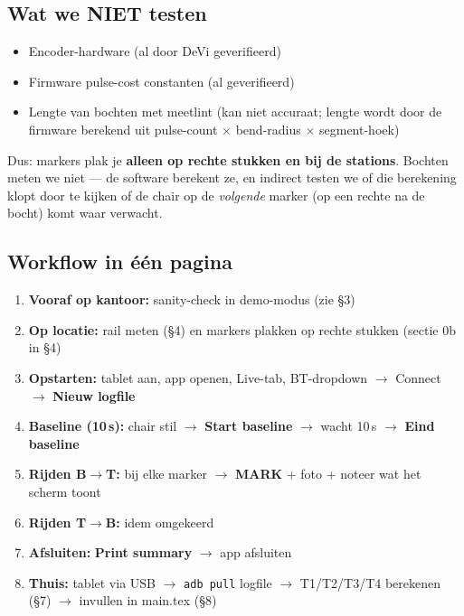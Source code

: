 \documentclass[11pt, a4paper]{article}
\begin{document}
\subsection*{Wat we NIET testen}

\begin{itemize}[leftmargin=2em, label=$\bullet$]
  \item Encoder-hardware (al door DeVi geverifieerd)
  \item Firmware pulse-cost constanten (al geverifieerd)
  \item Lengte van bochten met meetlint (kan niet accuraat; lengte
        wordt door de firmware berekend uit pulse-count $\times$
        bend-radius $\times$ segment-hoek)
\end{itemize}

Dus: markers plak je \textbf{alleen op rechte stukken en bij de
stations}. Bochten meten we niet --- de software berekent ze, en
indirect testen we of die berekening klopt door te kijken of de chair
op de \emph{volgende} marker (op een rechte na de bocht) komt waar
verwacht.

\subsection*{Workflow in één pagina}

\begin{enumerate}[leftmargin=2em]
  \item \textbf{Vooraf op kantoor:} sanity-check in demo-modus (zie §3)
  \item \textbf{Op locatie:} rail meten (§4) en markers plakken op
        rechte stukken (sectie 0b in §4)
  \item \textbf{Opstarten:} tablet aan, app openen, Live-tab, BT-dropdown
        $\rightarrow$ Connect $\rightarrow$ \textbf{Nieuw logfile}
  \item \textbf{Baseline (10\,s):} chair stil $\rightarrow$ \textbf{Start
        baseline} $\rightarrow$ wacht 10\,s $\rightarrow$ \textbf{Eind baseline}
  \item \textbf{Rijden B$\to$T:} bij elke marker $\rightarrow$ \textbf{MARK}
        + foto + noteer wat het scherm toont
  \item \textbf{Rijden T$\to$B:} idem omgekeerd
  \item \textbf{Afsluiten:} \textbf{Print summary} $\rightarrow$ app afsluiten
  \item \textbf{Thuis:} tablet via USB $\rightarrow$ \texttt{adb pull}
        logfile $\rightarrow$ T1/T2/T3/T4 berekenen (§7) $\rightarrow$
        invullen in main.tex (§8)
\end{enumerate}
\end{document}
